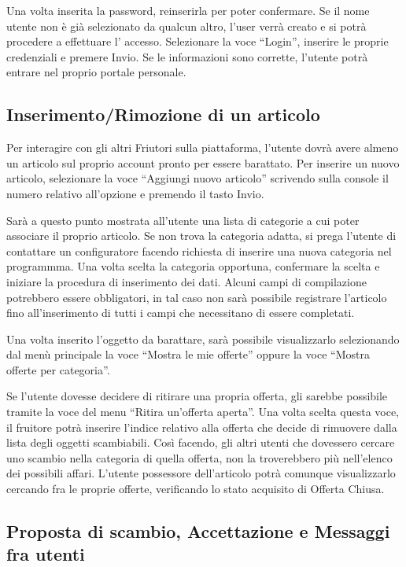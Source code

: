 Una volta inserita la password, reinserirla per poter confermare. Se il nome utente non è già selezionato da qualcun altro, l'user verrà creato e si potrà procedere a effettuare l' accesso.
Selezionare la voce ``Login'', inserire le proprie credenziali e premere Invio. Se le informazioni sono corrette, l'utente potrà entrare nel proprio portale personale.

\subsection{Inserimento/Rimozione di un articolo}
Per interagire con gli altri Friutori sulla piattaforma, l'utente dovrà avere almeno un articolo sul proprio account pronto per essere barattato.
Per inserire un nuovo articolo, selezionare la voce ``Aggiungi nuovo articolo'' scrivendo sulla console il numero relativo all'opzione e premendo il tasto Invio.

Sarà a questo punto mostrata all'utente una lista di categorie a cui poter associare il proprio articolo. Se non trova la categoria adatta, si prega l'utente di contattare un configuratore facendo richiesta di inserire una nuova categoria nel programmma.
Una volta scelta la categoria opportuna, confermare la scelta e iniziare la procedura di inserimento dei dati. Alcuni campi di compilazione potrebbero essere obbligatori, in tal caso non sarà
possibile registrare l'articolo fino all'inserimento di tutti i campi che necessitano di essere completati.

Una volta inserito l'oggetto da barattare, sarà possibile visualizzarlo selezionando dal menù principale la voce ``Mostra le mie offerte'' oppure la voce ``Mostra offerte per categoria''.

Se l'utente dovesse decidere di ritirare una propria offerta, gli sarebbe possibile tramite la voce del menu ``Ritira un'offerta aperta''. Una volta scelta questa voce,
il fruitore potrà inserire l'indice relativo alla offerta che decide di rimuovere dalla lista degli oggetti scambiabili. Così facendo, gli altri utenti che dovessero cercare uno scambio nella categoria di quella offerta,
non la troverebbero più nell'elenco dei possibili affari.
L'utente possessore dell'articolo potrà comunque visualizzarlo cercando fra le proprie offerte, verificando lo stato acquisito di Offerta Chiusa.

\subsection{Proposta di scambio, Accettazione e Messaggi fra utenti}
